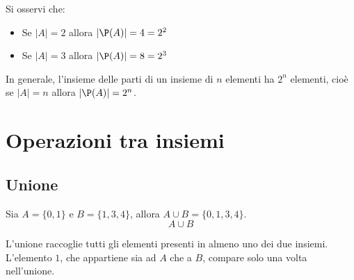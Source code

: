 \begin{esempio}

 Si osservi che:
\begin{itemize}
    \item Se $|A|=2$ allora $|\P(A)|=4=2^2$
    \item Se $|A|=3$ allora $|\P(A)|=8=2^3$
\end{itemize}
In generale, l'insieme delle parti di un insieme di $n$ elementi ha $2^n$ elementi, cioè se $|A |= n$ allora $|\P(A)|=2^n$.
\end{esempio}



\section{Operazioni tra insiemi}
\subsection{Unione}
\begin{esempio}
    
 Sia $A = \{0,1\}$ e $B=\{1,3,4\}$, allora $ A \cup B= \{0,1,3,4\}$.
\[
    A \cup B
\]

\begin{center}
    


\end{center}
L'unione raccoglie tutti gli elementi presenti in almeno uno dei due insiemi. L'elemento \(1\), che appartiene sia ad \(A\) che a \(B\), compare solo una volta nell'unione.
\end{esempio}

